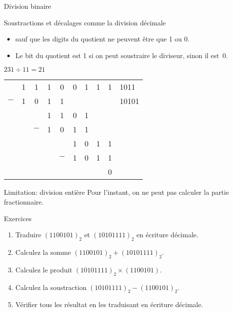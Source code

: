 \begin{frame}{Division binaire}
  \begin{block}{Soustractions et décalages comme la division décimale}
    \begin{itemize}
    \item sauf que les digits du quotient ne peuvent être que 1 ou 0.
    \item Le bit du quotient est 1 si on peut soustraire le diviseur, sinon il est~0. 
    \end{itemize}
    
  \end{block}
  \begin{exampleblock}{$231 \div 11 = 21$}
        \begin{tabular}{c*{8}{@{\,}c}|l}
          & 1 & 1   & 1 & 0   & 0 & 1 & 1 & 1 & 1011  \\ 
      $-$ & 1 & 0   & 1 & 1   &   &   &   &   & 10101 \\ 
          &   &     & 1 & 1   & 0 & 1 &   &   &       \\
          &   & $-$ & 1 & 0   & 1 & 1 &   &   &       \\
          &   &     &   &     & 1 & 0 & 1 & 1 &       \\
          &   &     &   & $-$ & 1 & 0 & 1 & 1 &       \\
          &   &     &   &     &   &   &   & 0 &       \\
      
    \end{tabular}
  \end{exampleblock}

  \begin{alertblock}{Limitation: division entière}
    Pour l'instant, on ne peut pas calculer la partie fractionnaire.
  \end{alertblock}

\end{frame}


\begin{frame}{Exercices}
  \begin{enumerate}
  \item Traduire $(1100101)_2$ et $(10101111)_2$ en écriture décimale.
  \item Calculez la somme $(1100101)_2 + (10101111)_2$.
  \item Calculez le produit $(10101111)_2 \times (1100101)$.
 \item Calculez la soustraction $(10101111)_2 - (1100101)_2$.
 \item Vérifier tous les résultat en les traduisant en écriture décimale.  
 \end{enumerate}

\end{frame}

